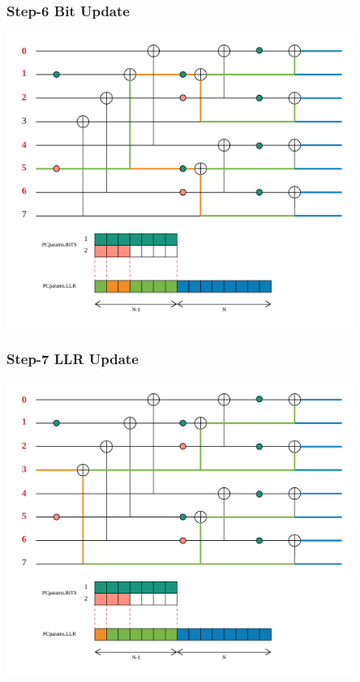 \documentclass{beamer}
\begin{document}
\begin{frame}
\frametitle{Step-6 Bit Update}
  \begin{center}
  \includegraphics[width=0.85\textwidth]{pics/polar_-_SC_bit_6.png}
  \end{center}
\end{frame}

\begin{frame}
\frametitle{Step-7 LLR Update}
  \begin{center}
  \includegraphics[width=0.85\textwidth]{pics/polar_-_SC_llr_7.png}
  \end{center}
\end{frame}
\end{document}
